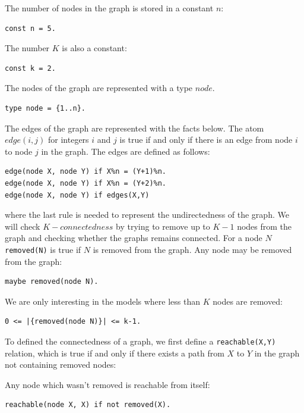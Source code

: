 \documentclass[a4paper,10pt]{article}
\begin{document}
\noindent


\medskip\noindent
The number of nodes in the graph is stored in a constant $n$:
\begin{verbatim}
const n = 5.
\end{verbatim}

\medskip\noindent
The number $K$ is also a constant:
\begin{verbatim}
const k = 2.
\end{verbatim} 

\medskip\noindent
The nodes of the graph are represented with a type $node$.

\begin{verbatim}
type node = {1..n}.
\end{verbatim}


\medskip\noindent
The edges of the graph are represented with the facts below. The atom $edge(i,j)$ for integers $i$ and $j$ is true if and only if there is an edge from node $i$ to node $j$ in the graph. The edges are defined as follows:

\begin{verbatim}
edge(node X, node Y) if X%n = (Y+1)%n.
edge(node X, node Y) if X%n = (Y+2)%n.
edge(node X, node Y) if edges(X,Y) 
\end{verbatim}

\noindent
where the last rule is needed to represent the undirectedness of the graph.
\medskip\noindent
We will check $K-connectedness$ by trying to remove up to $K-1$ nodes from the graph and checking whether the graphs remains connected.
For a node $N$ \texttt{removed(N)} is true if $N$ is removed from the graph. Any node may be removed from the graph:

\begin{verbatim}
maybe removed(node N).
\end{verbatim}   

\medskip\noindent
We are only interesting in the models where less than $K$ nodes are removed:

\begin{verbatim}
0 <= |{removed(node N)}| <= k-1.
\end{verbatim}

\medskip\noindent
To defined the connectedness of a graph, we first define a \texttt{reachable(X,Y)} relation, which is true if and only if there exists a path from $X$ to $Y$ in the graph not containing removed nodes:

\medskip\noindent
Any node which wasn't removed is reachable from itself:
\begin{verbatim}
reachable(node X, X) if not removed(X).
\end{verbatim}
\end{document}

